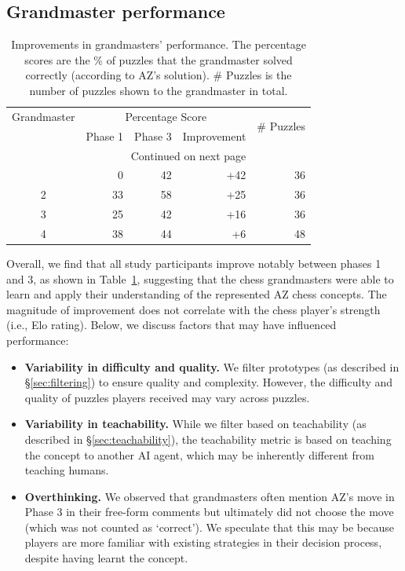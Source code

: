 \documentclass{article}
\begin{document}
\subsection{Grandmaster performance}
\begin{longtable}{c r r r r} 
\caption{Improvements in grandmasters' performance. 
The percentage scores are the \% of puzzles that the grandmaster solved correctly (according to AZ's solution). \# Puzzles is the number of puzzles shown to the grandmaster in total.}
\label{table:perf} \\ 
\toprule
Grandmaster & \multicolumn{3}{c}{Percentage Score} & 
\multirow{2}{*}{\# Puzzles}\\
 &  Phase 1 & Phase 3 & Improvement &  \\ 
\midrule
\endhead
\midrule
\multicolumn{4}{r}{{Continued on next page}} \\
\midrule
\endfoot
\bottomrule
\endlastfoot
1  & 0 & 42 & +42 & 36 \\ 
2  & 33 & 58 & +25  & 36 \\ 
3 & 25 & 42 & +16  & 36 \\ 
4  & 38 & 44 & +6   & 48 \\ 
\end{longtable}

Overall, we find that all study participants improve notably between phases 1 and 3, as shown in Table~\ref{table:perf}, suggesting that the chess grandmasters were able to learn and apply their understanding of the represented AZ chess concepts. 
The magnitude of improvement does not correlate with the chess player's strength (i.e., Elo rating).
Below, we discuss factors that may have influenced performance:
\begin{itemize}
    \item \textbf{Variability in difficulty and quality.} We filter prototypes (as described in \S\ref{sec:filtering}) to ensure quality and complexity. However, the difficulty and quality of puzzles players received may vary across puzzles. 
    \item \textbf{Variability in teachability.}
    While we filter based on teachability (as described in \S\ref{sec:teachability}), the teachability metric is based on teaching the concept to another AI agent, which may be inherently different from teaching humans. 
    \item \textbf{Overthinking.} We observed that grandmasters often mention AZ's move in Phase 3 in their free-form comments but ultimately did not choose the move (which was not counted as `correct'). We speculate that this may be because players are more familiar with existing strategies in their decision process, despite having learnt the concept.
\end{itemize}
\end{document}

